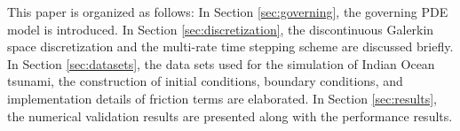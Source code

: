  This paper is organized as follows: In Section \ref{sec:governing}, the governing PDE model is introduced. In Section \ref{sec:discretization}, the discontinuous Galerkin space discretization and the multi-rate time stepping scheme are discussed briefly. In Section \ref{sec:datasets}, the data sets used for the simulation of Indian Ocean tsunami, the construction of initial conditions, boundary conditions, and implementation details of friction terms are elaborated. In Section \ref{sec:results}, the numerical validation results are presented along with the performance results. 

